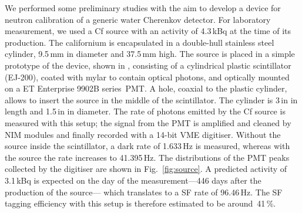 We performed some preliminary studies with the aim to develop a device for neutron calibration %
of a generic water Cherenkov detector.
For laboratory measurement, we used a Cf source with an activity of 4.3\,kBq at the time of its production.
The californium is encapsulated in a double-hull stainless steel cylinder, 9.5\,mm in diameter and 37.5\,mm high.
The source is placed in a simple prototype of the device, shown in , %
consisting of a cylindrical plastic scintillator (EJ-200), coated with mylar to contain optical photons, %
and optically mounted on a ET Enterprise 9902B series~PMT.
A hole, coaxial to the plastic cylinder, allows to insert the source in the middle of the scintillator.
The cylinder is 3\,in in length and 1.5\,in in diameter.
The rate of photons emitted by the Cf source is measured with this setup; %
the signal from the PMT is amplified and cleaned by NIM modules and finally recorded with a 14-bit VME digitiser.
Without the source inside the scintillator, a dark rate of 1.633\,Hz is measured, %
whereas with the source the rate increases to 41.395\,Hz.
The distributions of the PMT peaks collected by the digitiser are shown in Fig.~\ref{fig:source}.
A predicted activity of 3.1\,kBq is expected on the day of the measurement---446 days after the production of the source--- %
which translates to a SF rate of 96.46\,Hz.
The SF tagging efficiency with this setup is therefore estimated to be around~41\,\%.

